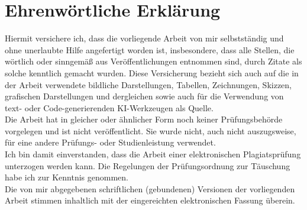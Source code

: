 \documentclass[a4paper, 11pt, german]{article}
\def\True{1}
\begin{document}
\clearpage
{}
\printbibliography




\clearpage
\section*{Ehrenwörtliche Erklärung}
Hiermit versichere ich, dass die vorliegende Arbeit von mir selbstständig und ohne unerlaubte Hilfe
angefertigt worden ist, insbesondere, dass alle Stellen, die wörtlich oder sinngemäß aus
Veröffentlichungen entnommen sind, durch Zitate als solche kenntlich gemacht wurden.
Diese Versicherung bezieht sich auch auf die in der Arbeit verwendete bildliche Darstellungen,
Tabellen, Zeichnungen, Skizzen, grafischen Darstellungen und dergleichen sowie auch für die
Verwendung von text- oder Code-generierenden KI-Werkzeugen als Quelle.
\vspace{1ex}\\
Die Arbeit hat in gleicher oder ähnlicher Form noch keiner Prüfungsbehörde vorgelegen und ist nicht
veröffentlicht. Sie wurde nicht, auch nicht auszugsweise, für eine andere Prüfungs- oder
Studienleistung verwendet.
\vspace{1ex}\\
Ich bin damit einverstanden, dass die Arbeit einer elektronischen Plagiatsprüfung unterzogen werden
kann. Die Regelungen der Prüfungsordnung zur Täuschung habe ich zur Kenntnis genommen.
\vspace{1ex}\\
Die von mir abgegebenen schriftlichen (gebundenen) Versionen der
vorliegenden Arbeit stimmen inhaltlich mit der eingereichten
elektronischen Fassung überein.

\vspace{3ex}

\begin{flushright}
\end{flushright}

%
%
\end{document}
